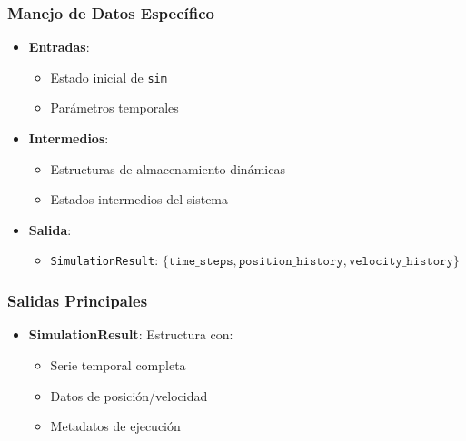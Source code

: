 \subsubsection{Manejo de Datos Específico}
\begin{itemize}
    \item \textbf{Entradas}:
    \begin{itemize}
        \item Estado inicial de \texttt{sim}
        \item Parámetros temporales
    \end{itemize}
    \item \textbf{Intermedios}:
    \begin{itemize}
        \item Estructuras de almacenamiento dinámicas
        \item Estados intermedios del sistema
    \end{itemize}
    \item \textbf{Salida}:
    \begin{itemize}
        \item \texttt{SimulationResult}: $\{\texttt{time\_steps}, \texttt{position\_history}, \texttt{velocity\_history}\}$
    \end{itemize}
\end{itemize}

\subsubsection{Salidas Principales}
\begin{itemize}
    \item \textbf{SimulationResult}: Estructura con:
    \begin{itemize}
        \item Serie temporal completa
        \item Datos de posición/velocidad
        \item Metadatos de ejecución
    \end{itemize}
\end{itemize}

